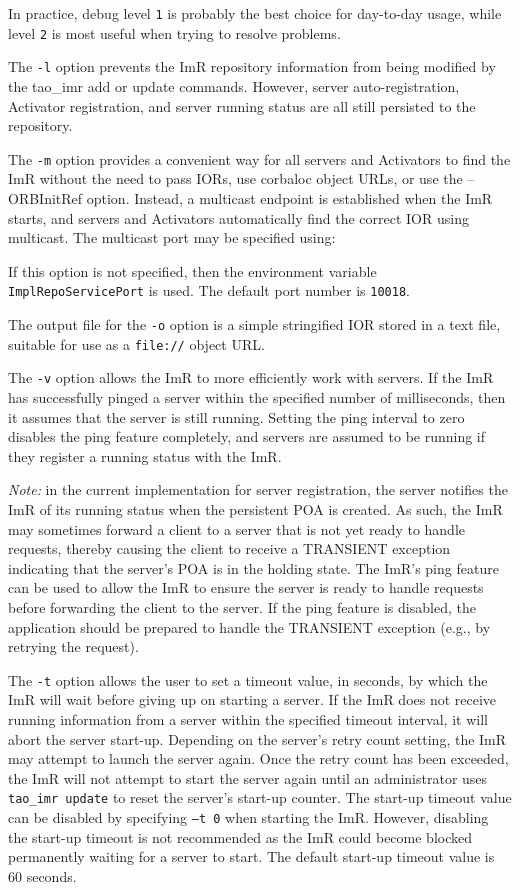 In practice, debug level {\tt 1} is probably the best choice for day-to-day usage, while level {\tt 2} is most
useful when trying to resolve problems.

The {\tt -l} option prevents the ImR repository information from being modified by the tao_imr add or
update commands. However, server auto-registration, Activator registration, and server running status are
all still persisted to the repository.

The {\tt -m} option provides a convenient way for all servers and Activators to find the ImR without
the need to pass IORs, use corbaloc object URLs, or use the –ORBInitRef option. Instead, a multicast
endpoint is established when the ImR starts, and servers and Activators automatically find the correct
IOR using multicast. The multicast port may be specified using:


If this option is not specified, then the environment variable {\tt ImplRepoServicePort} is used. The
default port number is {\tt 10018}.

The output file for the {\tt -o} option is a simple stringified IOR stored in a text file, suitable for use as a
{\tt file://} object URL.

The {\tt -v} option allows the ImR to more efficiently work with servers. If the ImR has successfully
pinged a server within the specified number of milliseconds, then it assumes that the server is still
running.  Setting the ping interval to zero disables the ping feature completely, and servers are assumed
to be running if they register a running status with the ImR.

\emph {Note:}  in the current implementation for server registration, the server notifies the ImR of its
running status when the persistent POA is created. As such, the ImR may sometimes forward a client to
a server that is not yet ready to handle requests, thereby causing the client to receive a TRANSIENT
exception indicating that the server’s POA is in the holding state. The ImR’s ping feature can be used
to allow the ImR to ensure the server is ready to handle requests before forwarding the client to the
server. If the ping feature is disabled, the application should be prepared to handle the TRANSIENT
exception (e.g., by retrying the request).

The {\tt -t} option allows the user to set a timeout value, in seconds, by which the ImR will wait before
giving up on starting a server. If the ImR does not receive running information from a server within the
specified timeout interval, it will abort the server start-up. Depending on the server’s retry count setting,
the ImR may attempt to launch the server again. Once the retry count has been exceeded, the ImR will
not attempt to start the server again until an administrator uses {\tt tao\_imr update} to reset the server’s
 start-up counter. The start-up timeout value can be disabled by specifying {\tt–t 0} when starting the ImR.
However, disabling the start-up timeout is not recommended as the ImR could become blocked
permanently waiting for a server to start. The default start-up timeout value is 60 seconds.

